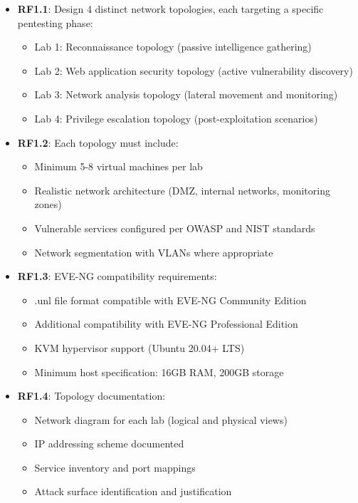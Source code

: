 \begin{itemize}

\item \textbf{RF1.1}: Design 4 distinct network topologies, each targeting a specific pentesting phase:
\begin{itemize}
\item Lab 1: Reconnaissance topology (passive intelligence gathering)
\item Lab 2: Web application security topology (active vulnerability discovery)
\item Lab 3: Network analysis topology (lateral movement and monitoring)
\item Lab 4: Privilege escalation topology (post-exploitation scenarios)
\end{itemize}

\item \textbf{RF1.2}: Each topology must include:
\begin{itemize}
\item Minimum 5-8 virtual machines per lab
\item Realistic network architecture (DMZ, internal networks, monitoring zones)
\item Vulnerable services configured per OWASP and NIST standards
\item Network segmentation with VLANs where appropriate
\end{itemize}

\item \textbf{RF1.3}: EVE-NG compatibility requirements:
\begin{itemize}
\item .unl file format compatible with EVE-NG Community Edition
\item Additional compatibility with EVE-NG Professional Edition
\item KVM hypervisor support (Ubuntu 20.04+ LTS)
\item Minimum host specification: 16GB RAM, 200GB storage
\end{itemize}

\item \textbf{RF1.4}: Topology documentation:
\begin{itemize}
\item Network diagram for each lab (logical and physical views)
\item IP addressing scheme documented
\item Service inventory and port mappings
\item Attack surface identification and justification
\end{itemize}

\end{itemize}

